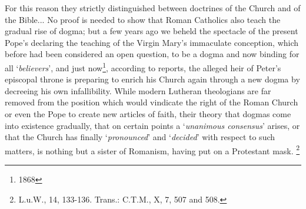 \begin{fancyquotes}
\par For this reason they strictly distinguished between doctrines of the Church and of the Bible... No proof is needed to show that Roman Catholics also teach the gradual rise of dogma; but a few years ago we beheld the spectacle of the present Pope’s declaring the teaching of the Virgin Mary’s immaculate conception, which before had been considered an open question, to be a dogma and now binding for all ‘\textit{believers}’, and just now\footnote{1868},  according to reports, the alleged heir of Peter’s episcopal throne is preparing to enrich his Church again through a new dogma by decreeing his own infallibility.  While modern Lutheran theologians are far removed from the position which would vindicate the right of the Roman Church or even the Pope to create new articles of faith, their theory that dogmas come into existence gradually, that on certain points a ‘\textit{unanimous consensus}’ arises, or that the Church has finally ‘\textit{pronounced}’ and ‘\textit{decided}’ with respect to such matters, is nothing but a sister of Romanism, having put on a Protestant mask. \footnote{L.u.W., 14, 133-136.  Trans.: C.T.M., X, 7, 507 and 508.}\end{fancyquotes} 

